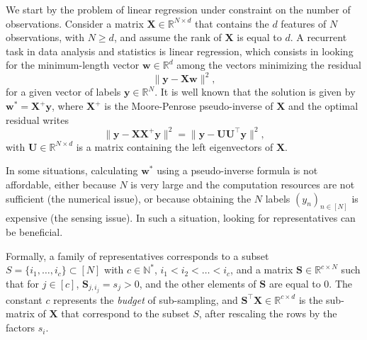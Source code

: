 \documentclass[twoside,11pt]{book}
\numberwithin{theorem}{chapter}
\numberwithin{definition}{chapter}
\numberwithin{proposition}{chapter}
\numberwithin{corollary}{chapter}
\numberwithin{example}{chapter}
\numberwithin{lemma}{chapter}
\numberwithin{assumption}{chapter}
\numberwithin{equation}{chapter}
\numberwithin{figure}{chapter}
\DeclareMathOperator{\Tran}{\intercal}
\begin{document}
We start by the problem of linear regression under constraint on the number of observations. Consider a matrix $\bm{X}\in \mathbb{R}^{N \times d}$ that contains the $d$ features of $N$ observations, with $N \geq d$, and assume the rank of $\bm{X}$ is equal to $d$. A recurrent task in data analysis and statistics is linear regression, which consists in looking for the minimum-length vector $\bm{w} \in \mathbb{R}^{d}$ among the vectors minimizing the residual
\begin{equation}
\|\bm{y} - \bm{X}\bm{w}\|^{2},
\end{equation}
for a given vector of labels $\bm{y} \in \mathbb{R}^{N}$. It is well known that the solution is given by $\bm{w}^{*} = \bm{X}^{+}\bm{y}$, where $\bm{X}^{+}$ is the Moore-Penrose pseudo-inverse of $\bm{X}$
and the optimal  residual writes
\begin{equation}
\|\bm{y} - \bm{X}\bm{X}^{+}\bm{y}\|^{2} = \|\bm{y} - \bm{U}\bm{U}^{\Tran}\bm{y}\|^{2},
\end{equation}
with $\bm{U} \in \mathbb{R}^{N \times d}$ is a matrix containing the left eigenvectors of $\bm{X}$.

In some situations, calculating $\bm{w}^{*}$ using a pseudo-inverse formula is not affordable, either because $N$ is very large and the computation resources are not sufficient (the numerical issue), or because obtaining the $N$ labels $(y_{n})_{n \in [N]}$ is expensive (the sensing issue). In such a situation, looking for representatives can be beneficial.

 Formally, a family of representatives 
 corresponds to a subset $S = \{i_{1}, \dots, i_{c} \} \subset [N]$ with $c \in \mathbb{N}^{*}$, $i_{1} < i_{2} < \dots < i_{c}$, and a matrix $\bm{S} \in \mathbb{R}^{c \times N}$ such that for $j \in [c]$, 
 $\bm{S}_{j,i_{j}}  = s_{j}>0$, and the other elements of $\bm{S}$ are equal to $0$. The constant $c$ represents the \emph{budget} of sub-sampling,
  and $\bm{S}^{\Tran}\bm{X} \in \mathbb{R}^{c \times d}$ is the sub-matrix of $\bm{X}$ that correspond to the subset $S$, after rescaling the rows by the factors $s_{i}$.
\end{document}
